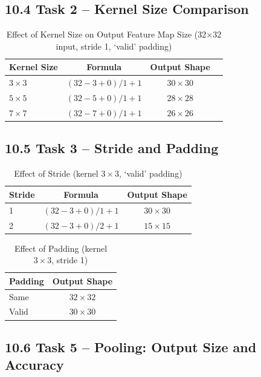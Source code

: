 \documentclass[11pt]{article}
\begin{document}
\subsection*{10.4 Task 2 -- Kernel Size Comparison}

\begin{table}[H]
\centering
\caption{Effect of Kernel Size on Output Feature Map Size (32×32 input, stride 1, `valid' padding)}
\begin{tabular}{lccc}
\toprule
Kernel Size & Formula & Output Shape \\
\midrule
$3\times3$ & $(32-3+0)/1+1$ & $30\times30$ \\
$5\times5$ & $(32-5+0)/1+1$ & $28\times28$ \\
$7\times7$ & $(32-7+0)/1+1$ & $26\times26$ \\
\bottomrule
\end{tabular}
\end{table}

\subsection*{10.5 Task 3 -- Stride and Padding}

\begin{table}[H]
\centering
\caption{Effect of Stride (kernel $3\times3$, `valid' padding)}
\begin{tabular}{lcc}
\toprule
Stride & Formula & Output Shape \\
\midrule
1 & $(32-3+0)/1+1$ & $30\times30$ \\
2 & $(32-3+0)/2+1$ & $15\times15$ \\
\bottomrule
\end{tabular}
\end{table}

\begin{table}[H]
\centering
\caption{Effect of Padding (kernel $3\times3$, stride 1)}
\begin{tabular}{lc}
\toprule
Padding & Output Shape \\
\midrule
Same & $32\times32$ \\
Valid & $30\times30$ \\
\bottomrule
\end{tabular}
\end{table}

\subsection*{10.6 Task 5 -- Pooling: Output Size and Accuracy}
\end{document}
